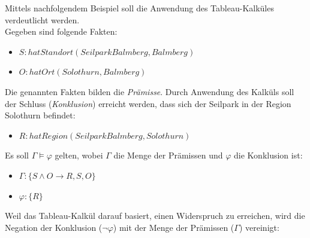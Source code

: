 \begin{table}[H]
\centering
{} \hfill
{}
\label{fig:tableau:regeln}
\end{table}

Mittels nachfolgendem Beispiel soll die Anwendung des Tableau-Kalküles verdeutlicht werden.\\
Gegeben sind folgende Fakten:
\begin{itemize}
    \item $S: hatStandort(SeilparkBalmberg, Balmberg)$
    \item $O: hatOrt(Solothurn, Balmberg)$
\end{itemize}
Die genannten Fakten bilden die \textit{Prämisse}. Durch Anwendung des Kalküls soll der Schluss (\textit{Konklusion}) erreicht werden, dass sich der Seilpark in der Region Solothurn befindet:
\begin{itemize}
    \item $R: hatRegion(SeilparkBalmberg, Solothurn)$
\end{itemize}

Es soll $\Gamma \models \varphi$ gelten, wobei $\Gamma$ die Menge der Prämissen und $\varphi$ die Konklusion ist:
\begin{itemize}
    \item $\Gamma: \{S \wedge O \rightarrow R, S, O\}$
    \item $\varphi: \{R\}$
\end{itemize}

Weil das Tableau-Kalkül darauf basiert, einen Widerspruch zu erreichen, wird die Negation der Konklusion ($\neg \varphi$) mit der Menge der Prämissen ($\Gamma$) vereinigt:

